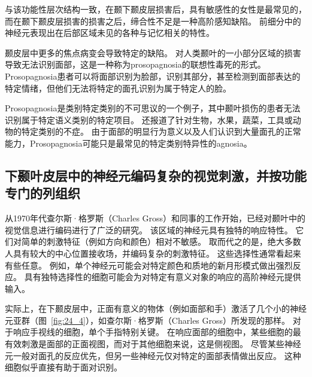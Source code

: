 与该功能性层次结构一致，在颞下颞皮层损害后，具有敏感性的女性是最常见的，而在颞下颞皮层损害的损害之后，缔合性不足是一种高阶感知缺陷。
前细分中的神经元表现出在后部区域未见的各种与记忆相关的特性。


颞皮层中更多的焦点病变会导致特定的缺陷。
对人类颞叶的一小部分区域的损害导致无法识别面部，这是一种称为prosopagnosia的联想性毒死的形式。
Prosopagnosia患者可以将面部识别为脸部，识别其部分，甚至检测到面部表达的特定情绪，但他们无法将特定的面孔识别为属于特定人的脸。


Prosopagnosia是类别特定类别的不可思议的一个例子，其中颞叶损伤的患者无法识别属于特定语义类别的特定项目。
还报道了针对生物，水果，蔬菜，工具或动物的特定类别的不症。
由于面部的明显行为意义以及人们认识到大量面孔的正常能力，Prosopagnosia可能只是最常见的特定类别特异性的agnosia。



\subsection{下颞叶皮层中的神经元编码复杂的视觉刺激，并按功能专门的列组织}

从1970年代查尔斯·格罗斯（Charles Gross）和同事的工作开始，已经对颞叶中的视觉信息进行编码进行了广泛的研究。
该区域的神经元具有独特的响应特性。
它们对简单的刺激特征（例如方向和颜色）相对不敏感。 
取而代之的是，绝大多数人具有较大的中心位置接收场，并编码复杂的刺激特征。
这些选择性通常看起来有些任意。
例如，单个神经元可能会对特定颜色和质地的新月形模式做出强烈反应。
具有独特选择性的细胞可能会为对特定有意义对象的响应的高阶神经元提供输入。


实际上，在下颞皮层中，正面有意义的物体（例如面部和手）激活了几个小的神经元亚群（图~\ref{fig:24_4}），如查尔斯·格罗斯（Charles Gross）所发现的那样。
对于响应手视线的细胞，单个手指特别关键。
在响应面部的细胞中，某些细胞的最有效刺激是面部的正面视图，而对于其他细胞来说，这是侧视图。
尽管某些神经元一般对面孔的反应优先，但另一些神经元仅对特定的面部表情做出反应。
这种细胞似乎直接有助于面对识别。


